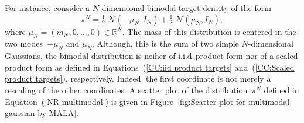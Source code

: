 For instance, consider a $N$-dimensional bimodal target density of the form
\begin{equation}
 \label{NR-multimodal}
 \pi^{N} = \tfrac{1}{2} \; \mathcal{N}(-\mu_N, I_N ) +  \tfrac{1}{2} \; \mathcal{N}(\mu_N, I_N ),
\end{equation}
where $\mu_N = (m_N, 0, \dots, 0) \in \mathbb{R}^N$. The mass of this distribution is centered in the two modes~$-\mu_N$ and $\mu_N$. Although, this is the sum of two simple $N$-dimensional Gaussians, the bimodal distribution is neiher of i.i.d.\,product form nor of a scaled product form as defined in Equations~(\ref{CC:iid product targets} and~(\ref{CC:Scaled product targets}), respectively. Indeed, the first coordinate is not merely a rescaling of the other coordinates. A scatter plot of the distribution~$\pi^N$ defined in Equation~(\ref{NR-multimodal}) is given in Figure~\ref{fig:Scatter plot for multimodal gaussian by MALA}. 


